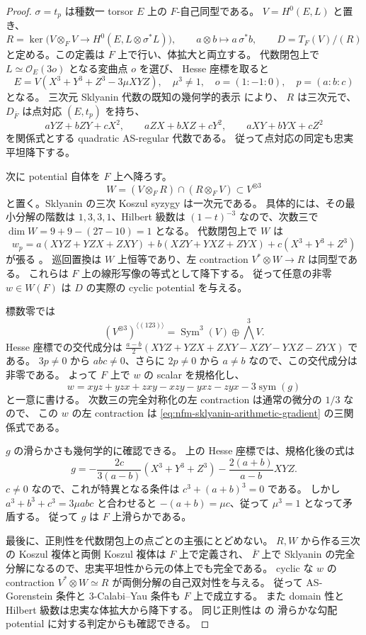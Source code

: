 \begin{proof}
$\sigma=t_p$ は種数一 torsor $E$ 上の $F$-自己同型である。
$V=H^0(E,L)$ と置き、
\[
 R=\ker\bigl(V\otimes_F V\longrightarrow
 H^0(E,L\otimes\sigma^*L)\bigr),\qquad
 a\otimes b\longmapsto a\,\sigma^*b,
 \qquad D=T_F(V)/(R)
\]
と定める。この定義は $F$ 上で行い、体拡大と両立する。
代数閉包上で $L\simeq\mathcal O_E(3o)$ となる変曲点 $o$ を選び、
Hesse 座標を取ると
\[
 E=V(X^3+Y^3+Z^3-3\mu XYZ),\quad \mu^3\ne1,
 \quad o=(1:-1:0),\quad p=(a:b:c)
\]
となる。
三次元 Sklyanin 代数の既知の幾何学的表示
\cite[Theorem~3.3 and \S4]{NFMMatsunoElliptic} により、
$R$ は三次元で、$D_{\overline F}$ は点対応 $(E,t_p)$ を持ち、
\[
 aYZ+bZY+cX^2,\qquad
 aZX+bXZ+cY^2,\qquad
 aXY+bYX+cZ^2
\]
を関係式とする quadratic AS-regular 代数である。
従って点対応の同定も忠実平坦降下する。

次に potential 自体を $F$ 上へ降ろす。
\[
 W=(V\otimes_F R)\cap(R\otimes_F V)\subset V^{\otimes3}
\]
と置く。Sklyanin の三次 Koszul syzygy は一次元である。
具体的には、その最小分解の階数は $1,3,3,1$、Hilbert 級数は
$(1-t)^{-3}$ なので、次数三で
$\dim W=9+9-(27-10)=1$ となる。
代数閉包上で $W$ は
\[
 w_p=a(XYZ+YZX+ZXY)+b(XZY+YXZ+ZYX)
      +c(X^3+Y^3+Z^3)
\]
が張る \cite[\S4, Corollary~4.3]{NFMMatsunoElliptic}。
巡回置換は $W$ 上恒等であり、左 contraction $V^*\otimes W\to R$ は同型である。
これらは $F$ 上の線形写像の等式として降下する。
従って任意の非零 $w\in W(F)$ は $D$ の実際の cyclic potential を与える。

標数零では
\[
 (V^{\otimes3})^{\langle(123)\rangle}
   =\operatorname{Sym}^3(V)\oplus\bigwedge^3V.
\]
Hesse 座標での交代成分は
$\frac{a-b}{2}(XYZ+YZX+ZXY-XZY-YXZ-ZYX)$ である。
$3p\ne0$ から $abc\ne0$、さらに $2p\ne0$ から $a\ne b$
\cite[Lemma~2.16]{NFMMatsunoElliptic} なので、この交代成分は非零である。
よって $F$ 上で $w$ の scalar を規格化し、
\[
 w=xyz+yzx+zxy-xzy-yxz-zyx-3\operatorname{sym}(g)
\]
と一意に書ける。
次数三の完全対称化の左 contraction は通常の微分の $1/3$ なので、
この $w$ の左 contraction は
\eqref{eq:nfm-sklyanin-arithmetic-gradient} の三関係式である。

$g$ の滑らかさも幾何学的に確認できる。
上の Hesse 座標では、規格化後の式は
\begin{equation}\label{eq:nfm-sklyanin-smooth-gradient}
 g=-\frac{2c}{3(a-b)}(X^3+Y^3+Z^3)
      -\frac{2(a+b)}{a-b}XYZ.
\end{equation}
$c\ne0$ なので、これが特異となる条件は
$c^3+(a+b)^3=0$ である。
しかし $a^3+b^3+c^3=3\mu abc$ と合わせると
$-(a+b)=\mu c$、従って $\mu^3=1$ となって矛盾する。
従って $g$ は $F$ 上滑らかである。

最後に、正則性を代数閉包上の点ごとの主張にとどめない。
$R,W$ から作る三次の Koszul 複体と両側 Koszul 複体は $F$ 上で定義され、
$\overline F$ 上で Sklyanin の完全分解になるので、忠実平坦性から元の体上でも完全である。
cyclic な $w$ の contraction $V^*\otimes W\simeq R$ が両側分解の自己双対性を与える。
従って AS-Gorenstein 条件と $3$-Calabi--Yau 条件も $F$ 上で成立する。
また domain 性と Hilbert 級数は忠実な体拡大から降下する。
同じ正則性は \cite[Corollary~2.9, Theorem~4.2(1)]{MoriSmith} の
滑らかな勾配 potential に対する判定からも確認できる。
\end{proof}

